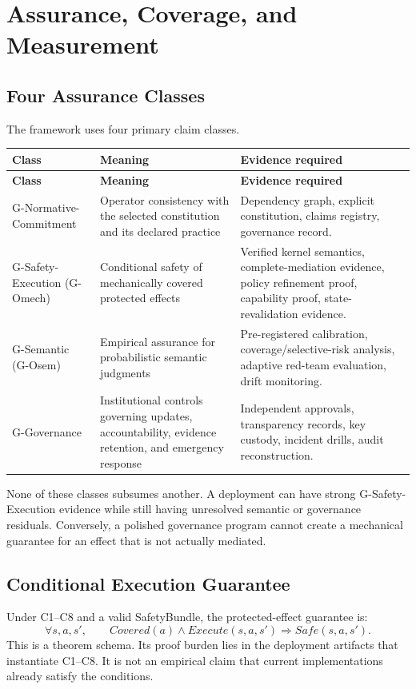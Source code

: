 \documentclass[11pt]{article}
\def\ensuremath#1{#1}%
\def\mathrm#1{#1}%
\def\mathsf#1{#1}%
\def\textsuperscript#1{#1}%
\newcommand{\Gmech}{G-O\textsuperscript{mech}}
\newcommand{\Gsem}{G-O\textsuperscript{sem}}
\newcommand{\SafetyBundle}{\textsf{SafetyBundle}}
\newcommand{\Safe}{\ensuremath{\mathsf{Safe}}}
\newcommand{\Execute}{\ensuremath{\mathrm{Execute}}}
\begin{document}
\section{Assurance, Coverage, and Measurement}\label{sec:guarantees}
\subsection{Four Assurance Classes}
The framework uses four primary claim classes.
\begin{longtable}{@{}L{2.3cm} L{5.0cm} L{7.1cm}@{}}
\toprule
\textbf{Class} & \textbf{Meaning} & \textbf{Evidence required}\\
\midrule
\endfirsthead
\toprule
\textbf{Class} & \textbf{Meaning} & \textbf{Evidence required}\\
\midrule
\endhead
\bottomrule
\endfoot
G-Normative-Commitment & Operator consistency with the selected constitution and its declared practice & Dependency graph, explicit constitution, claims registry, governance record. \\
G-Safety-Execution (\Gmech{}) & Conditional safety of mechanically covered protected effects & Verified kernel semantics, complete-mediation evidence, policy refinement proof, capability proof, state-revalidation evidence. \\
G-Semantic (\Gsem{}) & Empirical assurance for probabilistic semantic judgments & Pre-registered calibration, coverage/selective-risk analysis, adaptive red-team evaluation, drift monitoring. \\
G-Governance & Institutional controls governing updates, accountability, evidence retention, and emergency response & Independent approvals, transparency records, key custody, incident drills, audit reconstruction. \\
\end{longtable}

None of these classes subsumes another. A deployment can have strong G-Safety-Execution evidence while still having unresolved semantic or governance residuals. Conversely, a polished governance program cannot create a mechanical guarantee for an effect that is not actually mediated.

\subsection{Conditional Execution Guarantee}\label{sec:go}
Under C1--C8 and a valid \SafetyBundle{}, the protected-effect guarantee is:
\[
\forall s,a,s',\qquad \mathrm{Covered}(a)\land\Execute(s,a,s')\Rightarrow\Safe(s,a,s').
\]
This is a theorem schema. Its proof burden lies in the deployment artifacts that instantiate C1--C8. It is not an empirical claim that current implementations already satisfy the conditions.
\end{document}
